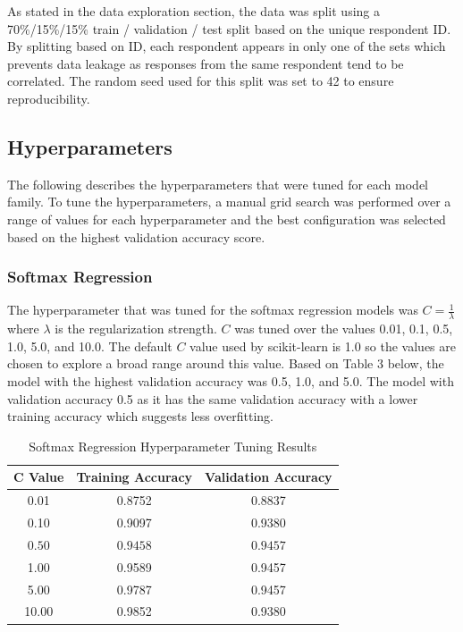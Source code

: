 \documentclass[12pt]{article}
\begin{document}
As stated in the data exploration section, the data was split using a 70\%/15\%/15\% train / validation / test split based on the unique respondent ID. By splitting based on ID, each respondent appears in only one of the sets which prevents data leakage as responses from the same respondent tend to be correlated. The random seed used for this split was set to 42 to ensure reproducibility.

\subsection*{Hyperparameters}

The following describes the hyperparameters that were tuned for each model family. To tune the hyperparameters, a manual grid search was performed over a range of values for each hyperparameter and the best configuration was selected based on the highest validation accuracy score.
\subsubsection*{Softmax Regression} The hyperparameter that was tuned for the softmax regression models was $C = \frac{1}{\lambda}$ where $\lambda$ is the regularization strength. $C$ was tuned over the values 0.01, 0.1, 0.5, 1.0, 5.0, and 10.0. The default $C$ value used by scikit-learn is 1.0 so the values are chosen to explore a broad range around this value. Based on Table 3 below, the model with the highest validation accuracy was 0.5, 1.0, and 5.0. The model with validation accuracy 0.5 as it has the same validation accuracy with a lower training accuracy which suggests less overfitting.
\begin{table}[h]
    \centering
    \caption{Softmax Regression Hyperparameter Tuning Results}
    \label{tab:softmax_tuning}
    \begin{tabular}{c c c}
        \hline
        \textbf{C Value} & \textbf{Training Accuracy} & \textbf{Validation Accuracy} \\
        \hline
        0.01 & 0.8752 & 0.8837 \\
        0.10 & 0.9097 & 0.9380 \\
        $\boxed{0.50}$ & $\boxed{0.9458}$ & $\boxed{0.9457}$ \\
        1.00 & 0.9589 & 0.9457 \\
        5.00 & 0.9787 & 0.9457 \\
        10.00 & 0.9852 & 0.9380 \\
        \hline
    \end{tabular}
\end{table}
\end{document}
